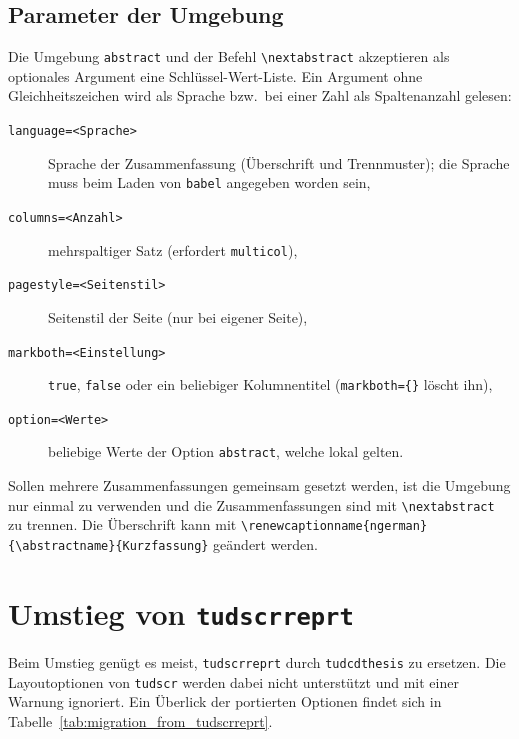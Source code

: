 \documentclass[
  logo={
    color=blue,
    language=de,
    colormodel=rgb
  },
  fontsize=11tudpt,
  usemargin,
  oneside
]{tudcdreprt}
\begin{document}
\subsection{Parameter der Umgebung}
Die Umgebung \texttt{abstract} und der Befehl \texttt{\textbackslash nextabstract} akzeptieren als optionales
Argument eine Schlüssel-Wert-Liste. Ein Argument ohne Gleichheitszeichen wird als Sprache
bzw.\ bei einer Zahl als Spaltenanzahl gelesen:
\begin{description}
  \item[\texttt{language=<Sprache>}] Sprache der Zusammenfassung (Überschrift und Trennmuster); die Sprache muss
    beim Laden von \texttt{babel} angegeben worden sein,
  \item[\texttt{columns=<Anzahl>}] mehrspaltiger Satz (erfordert \texttt{multicol}),
  \item[\texttt{pagestyle=<Seitenstil>}] Seitenstil der Seite (nur bei eigener Seite),
  \item[\texttt{markboth=<Einstellung>}] \texttt{true}, \texttt{false} oder ein beliebiger Kolumnentitel
    (\texttt{markboth=\{\}} löscht ihn),
  \item[\texttt{option=<Werte>}] beliebige Werte der Option \texttt{abstract}, welche lokal gelten.
\end{description}
Sollen mehrere Zusammenfassungen gemeinsam gesetzt werden, ist die Umgebung nur einmal zu verwenden und die
Zusammenfassungen sind mit \texttt{\textbackslash nextabstract} zu trennen. Die Überschrift kann mit
\texttt{\textbackslash renewcaptionname\{ngerman\}\{\textbackslash abstractname\}\{Kurzfassung\}} geändert werden.

\section{Umstieg von \texttt{tudscrreprt}}

Beim Umstieg genügt es meist, \texttt{tudscrreprt} durch \texttt{tudcdthesis} zu ersetzen.
Die Layoutoptionen von \texttt{tudscr} werden dabei nicht unterstützt und mit einer Warnung ignoriert.
Ein Überlick der portierten Optionen findet sich in Tabelle~\ref{tab:migration_from_tudscrreprt}.
\end{document}
